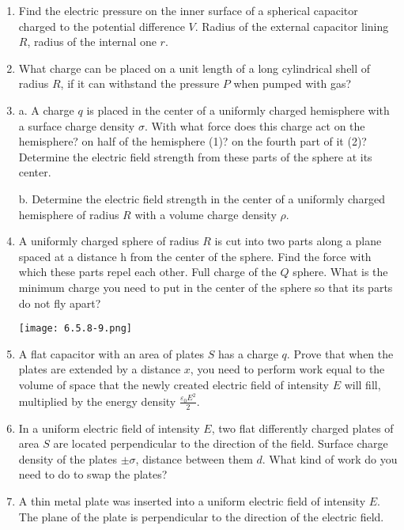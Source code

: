 \documentclass{article}
\begin{document}
\begin{enumerate}[label=6.5.\arabic*]
\item Find the electric pressure on the inner surface of a spherical capacitor charged to the potential difference $V$. Radius of the external capacitor lining $R$, radius of the internal one $r$.

\item What charge can be placed on a unit length of a long cylindrical shell of radius $R$, if it can withstand the pressure $P$ when pumped with gas?

\item a. A charge $q$ is placed in the center of a uniformly charged hemisphere with a surface charge density $\sigma$. With what force does this charge act on the hemisphere? on half of the hemisphere (1)? on the fourth part of it (2)? Determine the electric field strength from these parts of the sphere at its center. 

b. Determine the electric field strength in the center of a uniformly charged hemisphere of radius $R$ with a volume charge density $\rho$.

\item A uniformly charged sphere of radius $R$ is cut into two parts along a plane spaced at a distance h from the center of the sphere. Find the force with which these parts repel each other. Full charge of the $Q$ sphere. What is the minimum charge you need to put in the center of the sphere so that its parts do not fly apart?

\begin{center}
    \texttt{[image: 6.5.8-9.png]}
\end{center}

\item A flat capacitor with an area of plates $S$ has a charge $q$. Prove that when the plates are extended by a distance $x$, you need to perform work equal to the volume of space that the newly created electric field of intensity $E$ will fill, multiplied by the energy density $\frac{\varepsilon_0 E^2}{2}$.

\item In a uniform electric field of intensity $E$, two flat differently charged plates of area $S$ are located perpendicular to the direction of the field. Surface charge density of the plates $\pm \sigma$, distance between them $d$. What kind of work do you need to do to swap the plates?

\item A thin metal plate was inserted into a uniform electric field of intensity $E$. The plane of the plate is perpendicular to the direction of the electric field. 


\end{enumerate}
\end{document}
